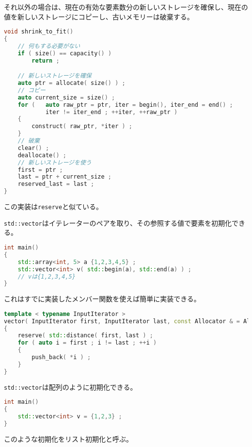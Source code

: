 それ以外の場合は、現在の有効な要素数分の新しいストレージを確保し、現在の値を新しいストレージにコピーし、古いメモリーは破棄する。

\begin{lstlisting}[language={C++}]
void shrink_to_fit()
{
    // 何もする必要がない
    if ( size() == capacity() )
        return ;

    // 新しいストレージを確保
    auto ptr = allocate( size() ) ;
    // コピー
    auto current_size = size() ;
    for (   auto raw_ptr = ptr, iter = begin(), iter_end = end() ;
            iter != iter_end ; ++iter, ++raw_ptr )
    {
        construct( raw_ptr, *iter ) ;
    }
    // 破棄
    clear() ;
    deallocate() ;
    // 新しいストレージを使う
    first = ptr ;
    last = ptr + current_size ;
    reserved_last = last ;
}
\end{lstlisting}

この実装は\texttt{reserve}と似ている。



\texttt{std::vector}はイテレーターのペアを取り、その参照する値で要素を初期化できる。

\begin{lstlisting}[language={C++}]
int main()
{
    std::array<int, 5> a {1,2,3,4,5} ;
    std::vector<int> v( std::begin(a), std::end(a) ) ;
    // vは{1,2,3,4,5}
}
\end{lstlisting}

これはすでに実装したメンバー関数を使えば簡単に実装できる。

\begin{lstlisting}[language={C++}]
template < typename InputIterator >
vector( InputIterator first, InputIterator last, const Allocator & = Allocator() )
{
    reserve( std::distance( first, last ) ;
    for ( auto i = first ; i != last ; ++i )
    {
        push_back( *i ) ;
    }
}
\end{lstlisting}

\clearpage
{}

\texttt{std::vector}は配列のように初期化できる。

\begin{lstlisting}[language={C++}]
int main()
{
    std::vector<int> v = {1,2,3} ;
}
\end{lstlisting}

このような初期化を\textsf{リスト初期化}と呼ぶ。

